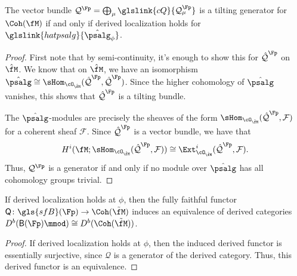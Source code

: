 \begin{lemma}\label{lem:tiling-localization}
The vector bundle $\mathcal{Q}^{\Fp}=\bigoplus_{\mu}\glslink{cQ}{\mathcal{Q}_\mu^{\Fp}}$ is a tilting generator for $\Coh(\fM)$ if and only if derived localization holds for $\glslink{hatpsalg}{\hat{\psalg}_\phi}$.  
\end{lemma}
\begin{proof}
First note that  by semi-continuity, it's enough to show this for $\mathcal{\hat Q}^{\Fp}$ on $\hat{\fM}$.  We know that on $\hat{\fM}$, we have an isomorphism $\hat{\psalg}\cong \sHom_{\cO_{\hat{\fM}}}(\mathcal{\hat Q}^{\Fp},\mathcal{\hat Q}^{\Fp})$.  Since the higher cohomology of $\hat{\psalg}$ vanishes, this shows that $\mathcal{\hat Q}^{\Fp}$ is a tilting bundle.  

The $\hat{\psalg}$-modules are precisely the sheaves of the form $\sHom_{\cO_{\hat{\fM}}}(\mathcal{\hat Q}^{\Fp},\mathcal{F})$ for a coherent sheaf $\mathcal{F}$. Since $\mathcal{\hat Q}^{\Fp}$ is a vector bundle, we have that \[H^i(\fM;\sHom_{\cO_{\hat{\fM}}}(\mathcal{\hat Q}^{\Fp},\mathcal{F}))\cong \Ext^i_{\cO_{\hat{\fM}}}(\mathcal{\hat Q}^{\Fp},\mathcal{F}).\] Thus, $\mathcal{Q}^{\Fp}$ is a generator if and only if no module over $\hat{\psalg}$ has all cohomology groups trivial.   
\end{proof}

\begin{corollary} 
If derived localization holds at $\phi$, then the fully faithful functor  $\mathsf{Q}\colon \gls{sfB}(\Fp)\to \Coh(\tilde{\fM})$  induces an equivalence of derived categories $D^b(\mathsf{B}(\Fp)\mmod)\cong D^b(\Coh(\tilde{\fM}))$.
\end{corollary}
\begin{proof}
  If derived localization holds at $\phi$, then the induced derived functor is essentially surjective, since $\mathcal{Q}$ is a generator of the derived category.  Thus, this derived functor is an equivalence. 
\end{proof}


